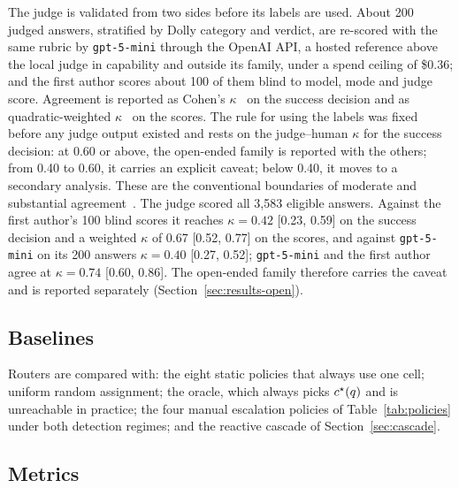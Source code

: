 The judge is validated from two sides before its labels are used. About 200
judged answers, stratified by Dolly category and verdict, are re-scored with
the same rubric by \texttt{gpt-5-mini} through the OpenAI API, a hosted
reference above the local judge in capability and outside its family, under
a spend ceiling of \$0.36; and the first author scores about 100 of them
blind to model, mode and judge score.
Agreement is reported as Cohen's $\kappa$~\cite{cohen1960kappa} on the
success decision and as quadratic-weighted $\kappa$~\cite{cohen1968weighted}
on the scores. The rule for using the labels was fixed before any judge
output existed and rests on the judge--human $\kappa$ for the success
decision: at 0.60 or above, the open-ended family is reported with the
others; from 0.40 to 0.60, it carries an explicit caveat; below 0.40, it
moves to a secondary analysis. These are the conventional boundaries
of moderate and substantial agreement~\cite{landis1977measurement}. The
judge scored all 3{,}583 eligible answers. Against the first author's 100
blind scores it reaches $\kappa = 0.42$ [0.23, 0.59] on the success decision
and a weighted $\kappa$ of 0.67 [0.52, 0.77] on the scores, and against
\texttt{gpt-5-mini} on its 200 answers $\kappa = 0.40$ [0.27, 0.52];
\texttt{gpt-5-mini} and the first author agree at $\kappa = 0.74$ [0.60,
0.86]. The open-ended family therefore carries the caveat and is reported
separately (Section~\ref{sec:results-open}).

\subsection{Baselines}
\label{sec:baselines}

Routers are compared with: the eight static policies that always use one
cell; uniform random assignment; the oracle, which always picks $c^{\star}(q)$
and is unreachable in practice; the four manual escalation policies of
Table~\ref{tab:policies} under both detection regimes; and the reactive
cascade of Section~\ref{sec:cascade}.

\subsection{Metrics}
\label{sec:metrics}

